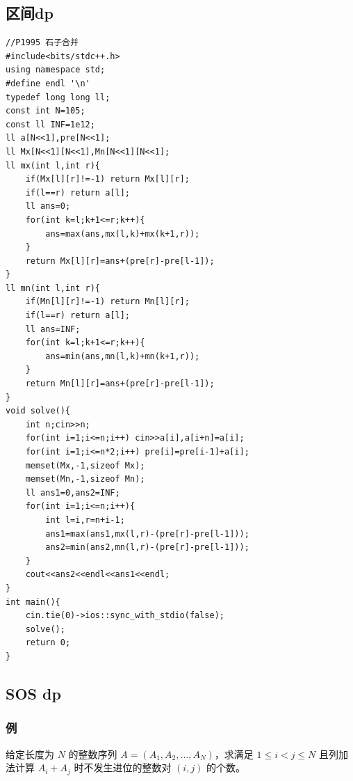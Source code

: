 \documentclass[11pt,a4paper,twocolumn]{ctexart}  %
\begin{document}
\subsection{区间dp}
\begin{lstlisting}[caption={区间dp典},label={区间dp}]
//P1995 石子合并
#include<bits/stdc++.h>
using namespace std;
#define endl '\n'
typedef long long ll;
const int N=105;
const ll INF=1e12;
ll a[N<<1],pre[N<<1];
ll Mx[N<<1][N<<1],Mn[N<<1][N<<1];
ll mx(int l,int r){
    if(Mx[l][r]!=-1) return Mx[l][r];
    if(l==r) return a[l];
    ll ans=0;
    for(int k=l;k+1<=r;k++){
        ans=max(ans,mx(l,k)+mx(k+1,r));
    }
    return Mx[l][r]=ans+(pre[r]-pre[l-1]);
}
ll mn(int l,int r){
    if(Mn[l][r]!=-1) return Mn[l][r];
    if(l==r) return a[l];
    ll ans=INF;
    for(int k=l;k+1<=r;k++){
        ans=min(ans,mn(l,k)+mn(k+1,r));
    }
    return Mn[l][r]=ans+(pre[r]-pre[l-1]);
}
void solve(){
    int n;cin>>n;
    for(int i=1;i<=n;i++) cin>>a[i],a[i+n]=a[i];
    for(int i=1;i<=n*2;i++) pre[i]=pre[i-1]+a[i];
    memset(Mx,-1,sizeof Mx);
    memset(Mn,-1,sizeof Mn);
    ll ans1=0,ans2=INF;
    for(int i=1;i<=n;i++){
        int l=i,r=n+i-1;
        ans1=max(ans1,mx(l,r)-(pre[r]-pre[l-1]));
        ans2=min(ans2,mn(l,r)-(pre[r]-pre[l-1]));
    }
    cout<<ans2<<endl<<ans1<<endl;
}
int main(){
    cin.tie(0)->ios::sync_with_stdio(false);
    solve();
    return 0;
}
\end{lstlisting}
\subsection{SOS dp}

\subsubsection*{例}

给定长度为 $N$ 的整数序列 $A = (A_1, A_2, \dots, A_N)$，求满足 $1 \leq i < j \leq N$ 且列加法计算 $A_i + A_j$ 时不发生进位的整数对 $(i, j)$ 的个数。
\end{document}
